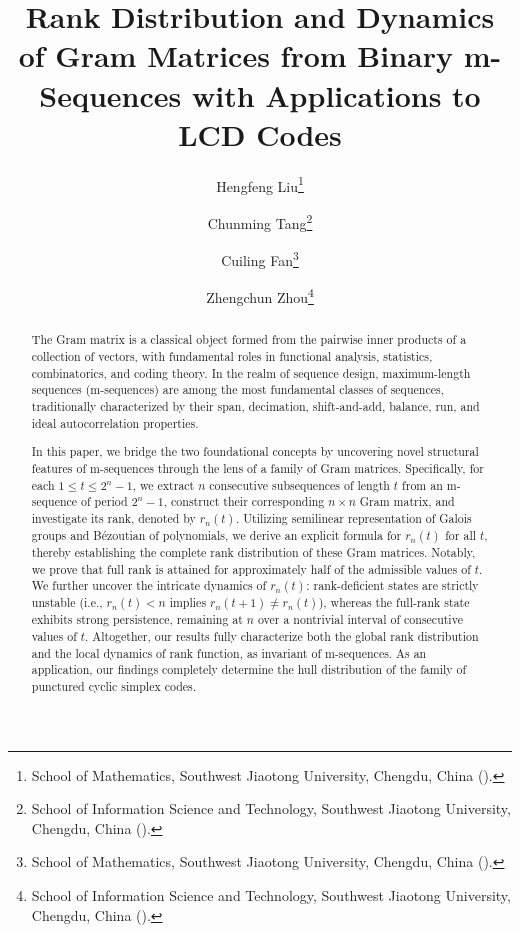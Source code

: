 \documentclass[hidelinks,onefignum,onetabnum]{siamart251216}
\theoremstyle{definition}
\theoremstyle{remark}
\begin{document}
	
	\title{Rank Distribution and Dynamics of Gram Matrices from Binary m-Sequences with Applications to LCD Codes}
	
	\author{%
		Hengfeng Liu\thanks{School of Mathematics, Southwest Jiaotong University, Chengdu, China ().}%
		\and
		Chunming Tang\thanks{School of Information Science and Technology, Southwest Jiaotong University, Chengdu, China ().}%
        \and
	Cuiling Fan\thanks{School of Mathematics, Southwest Jiaotong University, Chengdu, China ().}
    \and
    Zhengchun Zhou\thanks{School of Information Science and Technology, Southwest Jiaotong University, Chengdu, China ().}}
    
    
	
	\maketitle
	
	\begin{abstract}
The Gram matrix is a classical object formed from the pairwise inner products of a collection of vectors, with fundamental roles in functional analysis, statistics, combinatorics, and coding theory. In the realm of sequence design, maximum-length sequences (m-sequences) are among the most fundamental classes of sequences, traditionally characterized by their span, decimation, shift-and-add, balance, run, and ideal autocorrelation properties.

In this paper, we bridge the two foundational concepts by uncovering novel structural features of m-sequences through the lens of a family of Gram matrices. Specifically, for each $1 \le t \le 2^n - 1$, we extract $n$ consecutive subsequences of length $t$ from an m-sequence of period $2^n - 1$, construct their corresponding $n \times n$ Gram matrix, and investigate its rank, denoted by $r_n(t)$. Utilizing semilinear representation of Galois groups and B\'ezoutian of polynomials, we derive an explicit formula for $r_n(t)$ for all $t$, thereby establishing the complete rank distribution of these Gram matrices. Notably, we prove that full rank is attained for approximately half of the admissible values of $t$. We further uncover the intricate dynamics of $r_n(t)$: rank-deficient states are strictly unstable (i.e., $r_n(t) < n$ implies $r_n(t+1) \ne r_n(t)$), whereas the full-rank state exhibits strong persistence, remaining at $n$ over a nontrivial interval of consecutive values of $t$. Altogether, our results fully characterize both the global rank distribution and the local dynamics of rank function, as invariant of m-sequences. As an application, our findings completely determine the hull distribution of the family of punctured cyclic simplex codes.
\end{abstract}
	
\end{document}
